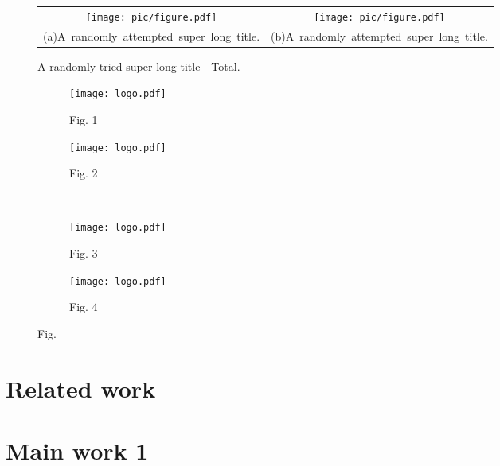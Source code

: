 \documentclass[doctor,english]{thesis-uestc}  %
\begin{document}
\begin{figure}[!htb]
    \small
    \centering
    \begin{tabular}{@{\ }c@{\ }c}
        \texttt{[image: pic/figure.pdf]} & 
        \hspace{5pt}
        \texttt{[image: pic/figure.pdf]}     \\
        \mbox{\small (a)A randomly attempted super long title.}                                                                               & 
        \mbox{\small (b)A randomly attempted super long title.}                                                                                  \\
    \end{tabular}
    \caption{A randomly tried super long title - Total.}
    \label{fig:test}
\end{figure}

\begin{figure}[!htbp]
    \centering
    \begin{subfigure}[t]{0.35\linewidth}
        \centering
        \texttt{[image: logo.pdf]}
        \caption{Fig. 1}
        \label{fig:1-1}
    \end{subfigure}
    \begin{subfigure}[t]{0.35\linewidth}
        \centering
        \texttt{[image: logo.pdf]}
        \caption{Fig. 2}
        \label{fig:1-2}
    \end{subfigure}
    \\[6bp]
    \begin{subfigure}[t]{0.35\linewidth}
        \centering
        \texttt{[image: logo.pdf]}
        \caption{Fig. 3}
        \label{fig:1-3}
    \end{subfigure}
    \begin{subfigure}[t]{0.35\linewidth}
        \centering
        \texttt{[image: logo.pdf]}
        \caption{Fig. 4}
        \label{fig:1-4}
    \end{subfigure}
    \caption{Fig.}
    \label{fig:1}
\end{figure}


\chapter{Related work}
\chapter{Main work 1}
\end{document}
